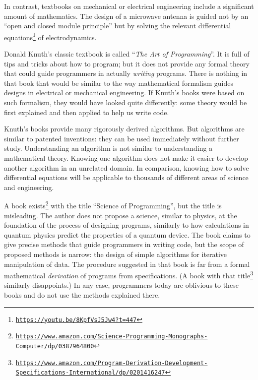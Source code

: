 In contrast, textbooks on mechanical or electrical engineering include
a significant amount of mathematics. The design of a microwave antenna
is guided not by an \textsf{``}open and closed module principle\textsf{''} but by
solving the relevant differential equations\footnote{\texttt{\href{https://youtu.be/8KpfVsJ5Jw4?t=447}{https://youtu.be/8KpfVsJ5Jw4?t=447}}}
of electrodynamics.

Donald Knuth\textsf{'}s classic textbook is called \textsf{``}\emph{The Art of Programming}\textsf{''}.
It is full of tips and tricks about how to program; but it does not
provide any formal theory that could guide programmers in actually
\emph{writing} programs. There is nothing in that book that would
be similar to the way mathematical formalism guides designs in electrical
or mechanical engineering. If Knuth\textsf{'}s books were based on such formalism,
they would have looked quite differently: some theory would be first
explained and then applied to help us write code.

Knuth\textsf{'}s books provide many rigorously derived algorithms. But algorithms
are similar to patented inventions: they can be used immediately without
further study. Understanding an algorithm is not similar to understanding
a mathematical theory. Knowing one algorithm does not make it easier
to develop another algorithm in an unrelated domain. In comparison,
knowing how to solve differential equations will be applicable to
thousands of different areas of science and engineering.

A book exists\footnote{\texttt{\href{https://www.amazon.com/Science-Programming-Monographs-Computer/dp/0387964800}{https://www.amazon.com/Science-Programming-Monographs-Computer/dp/0387964800}}}
with the title \textsf{``}Science of Programming\textsf{''}, but the title is misleading.
The author does not propose a science, similar to physics, at the
foundation of the process of designing programs, similarly to how
calculations in quantum physics predict the properties of a quantum
device. The book claims to give precise methods that guide programmers
in writing code, but the scope of proposed methods is narrow: the
design of simple algorithms for iterative manipulation of data. The
procedure suggested in that book is far from a formal mathematical
\emph{derivation} of programs from specifications. (A book with that
title\footnote{\texttt{\href{https://www.amazon.com/Program-Derivation-Development-Specifications-International/dp/0201416247}{https://www.amazon.com/Program-Derivation-Development-Specifications-International/dp/0201416247}}}
similarly disappoints.) In any case, programmers today are oblivious
to these books and do not use the methods explained there.

